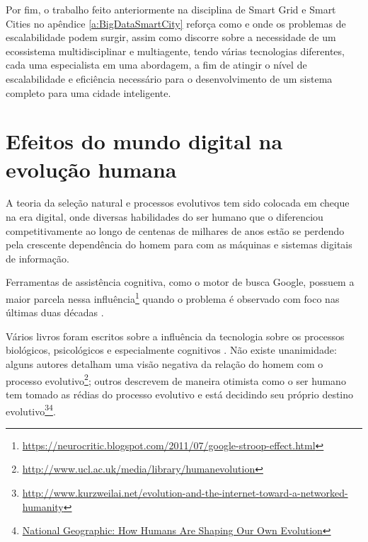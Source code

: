 Por fim, o trabalho feito anteriormente na disciplina de Smart Grid e Smart Cities no apêndice \ref{a:BigDataSmartCity} reforça como e onde os problemas de escalabilidade podem surgir, assim como discorre sobre a necessidade de um ecossistema multidisciplinar e multiagente, tendo várias tecnologias diferentes, cada uma especialista em uma abordagem, a fim de atingir o nível de escalabilidade e eficiência necessário para o desenvolvimento de um sistema completo para uma cidade inteligente.

\section{Efeitos do mundo digital na evolução humana}

A teoria da seleção natural e processos evolutivos tem sido colocada em cheque na era digital, onde diversas habilidades do ser humano que o diferenciou competitivamente ao longo de centenas de milhares de anos estão se perdendo pela crescente dependência do homem para com as máquinas e sistemas digitais de informação.

Ferramentas de assistência cognitiva, como o motor de busca Google, possuem a maior parcela nessa influência\footnote{\url{https://neurocritic.blogspot.com/2011/07/google-stroop-effect.html}} quando o problema é observado com foco nas últimas duas décadas \cite{Sparrow2011GoogleEO}. 

Vários livros foram escritos sobre a influência da tecnologia sobre os processos biológicos, psicológicos e especialmente cognitivos \cite{theshallows, theglasscage}. Não existe unanimidade: alguns autores detalham uma visão negativa da relação do homem com o processo evolutivo\footnote{\url{http://www.ucl.ac.uk/media/library/humanevolution}}; outros descrevem de maneira otimista como o ser humano tem tomado as rédias do processo evolutivo e está decidindo seu próprio destino evolutivo\footnote{\url{http://www.kurzweilai.net/evolution-and-the-internet-toward-a-networked-humanity}}\footnote{\href{https://www.nationalgeographic.com/magazine/2017/04/evolution-genetics-medicine-brain-technology-cyborg/}{National Geographic: How Humans Are Shaping Our Own Evolution}}.